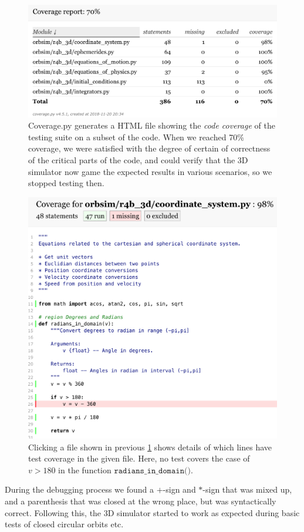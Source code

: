 \begin{figure}[ht]
    \centering
    \includegraphics[width=0.90\linewidth]{fig/Coverage-py.png}
    \caption{Coverage.py generates a HTML file showing the \emph{code coverage} of the testing suite on a subset of the code. When we reached 70\% coverage, we were satisfied with the degree of certain of correctness of the critical parts of the code, and could verify that the 3D simulator now game the expected results in various scenarios, so we stopped testing then.}
    \label{fig:Coverage-py}
\end{figure}

\begin{figure}[ht]
    \centering
    \includegraphics[width=0.90\linewidth]{fig/Coverage-py-file.png}
    \caption{Clicking a file shown in previous \cref{fig:Coverage-py} shows details of which lines have test coverage in the given file. Here, no test covers the case of $v > 180$ in the function $\texttt{radians\_in\_domain().}$}
    \label{fig:Coverage-py-file}
\end{figure}

During the debugging process we found a $+$-sign and $*$-sign that was mixed up, and a parenthesis that was closed at the wrong place, but was syntactically correct. Following this, the 3D simulator started to work as expected during basic tests of closed circular orbits etc.
